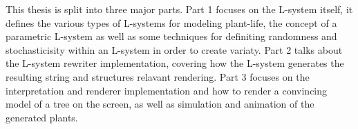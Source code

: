 This thesis is split into three major parts. Part 1 focuses on the L-system itself, it defines the various types of L-systems for modeling plant-life, the concept of a parametric L-system as well as some techniques for definiting randomness and stochasticisity within an L-system in order to create variaty. Part 2 talks about the L-system rewriter implementation, covering how the L-system generates the resulting string and structures relavant rendering. Part 3 focuses on the interpretation and renderer implementation and how to render a convincing model of a tree on the screen, as well as simulation and animation of the generated plants.





